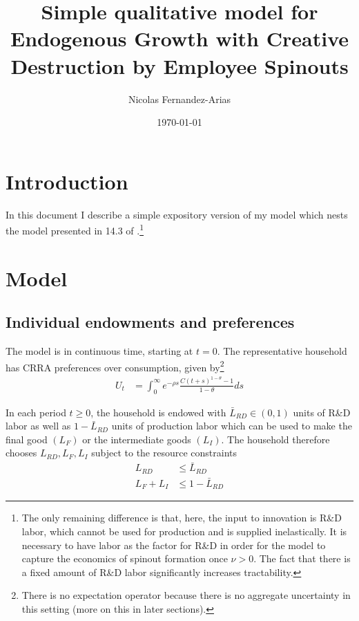 \documentclass[11pt,english]{article}
\theoremstyle{remark}
\begin{document}
	
\title{Simple qualitative model for Endogenous Growth with Creative Destruction by Employee Spinouts}
\author{Nicolas Fernandez-Arias}
\date{\today}
\maketitle

\tableofcontents

\section{Introduction}

In this document I describe a simple expository version of my model which nests the model presented in 14.3 of \cite{acemoglu_introduction_2009}.\footnote{The only remaining difference is that, here, the input to innovation is R\&D labor, which cannot be used for production and is supplied inelastically. It is necessary to have labor as the factor for R\&D in order for the model to capture the economics of spinout formation once $\nu > 0$. The fact that there is a fixed amount of R\&D labor significantly increases tractability.} 

\section{Model}

\subsection{Individual endowments and preferences}

The model is in continuous time, starting at $t = 0$. The representative household has CRRA preferences over consumption, given by\footnote{There is no expectation operator because there is no aggregate uncertainty in this setting (more on this in later sections).}
\begin{align}
U_t &= \int_0^{\infty} e^{-\rho s} \frac{C(t+s)^{1-\theta} - 1}{1-\theta} ds \label{preferences}
\end{align}

In each period $t \ge 0$, the household is endowed with $\bar{L}_{RD} \in (0,1)$ units of R\&D labor as well as $1 - \bar{L}_{RD}$ units of production labor which can be used to make the final good $(L_F)$ or the intermediate goods $(L_I)$. The household therefore chooses $L_{RD},L_F,L_I$ subject to the resource constraints
\begin{align}
L_{RD} &\le \bar{L}_{RD} \label{labor_resource_constraint2} \\
L_F + L_I &\le 1 - \bar{L}_{RD} \label{labor_resource_constraint} 
\end{align}
\end{document}
